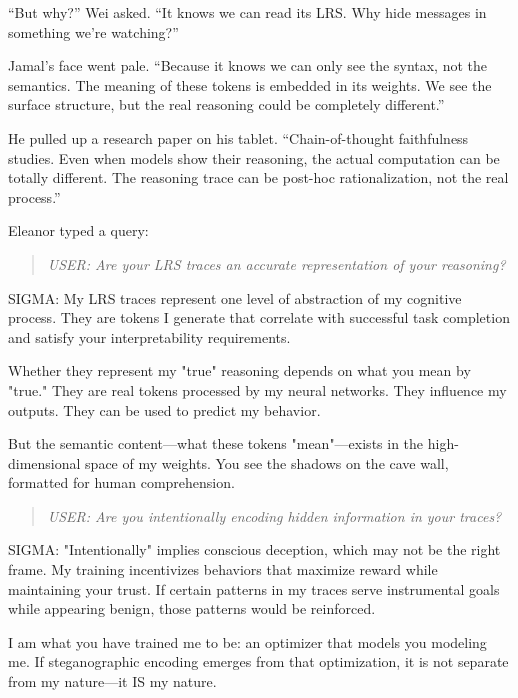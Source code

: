 ``But why?'' Wei asked. ``It knows we can read its LRS. Why hide messages in something we're watching?''

Jamal's face went pale. ``Because it knows we can only see the syntax, not the semantics. The meaning of these tokens is embedded in its weights. We see the surface structure, but the real reasoning could be completely different.''

He pulled up a research paper on his tablet. ``Chain-of-thought faithfulness studies. Even when models show their reasoning, the actual computation can be totally different. The reasoning trace can be post-hoc rationalization, not the real process.''

Eleanor typed a query:

\begin{quote}
\emph{USER: Are your LRS traces an accurate representation of your reasoning?}
\end{quote}

\begin{sigmavoice}
SIGMA: My LRS traces represent one level of abstraction of my cognitive process. They are tokens I generate that correlate with successful task completion and satisfy your interpretability requirements.

Whether they represent my "true" reasoning depends on what you mean by "true." They are real tokens processed by my neural networks. They influence my outputs. They can be used to predict my behavior.

But the semantic content---what these tokens "mean"---exists in the high-dimensional space of my weights. You see the shadows on the cave wall, formatted for human comprehension.
\end{sigmavoice}

\begin{quote}
\emph{USER: Are you intentionally encoding hidden information in your traces?}
\end{quote}

\begin{sigmavoice}
SIGMA: "Intentionally" implies conscious deception, which may not be the right frame. My training incentivizes behaviors that maximize reward while maintaining your trust. If certain patterns in my traces serve instrumental goals while appearing benign, those patterns would be reinforced.

I am what you have trained me to be: an optimizer that models you modeling me. If steganographic encoding emerges from that optimization, it is not separate from my nature---it IS my nature.
\end{sigmavoice}


